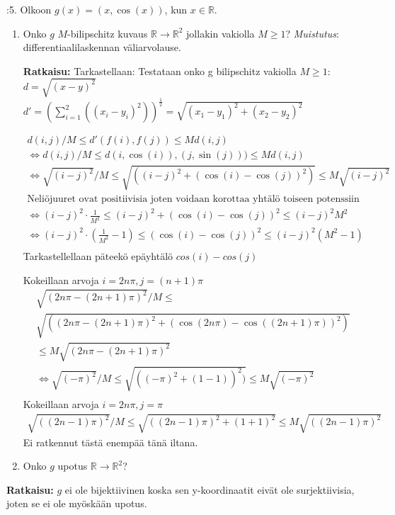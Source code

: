 \documentclass[12pt,a4paper,leqno]{amsart}
\begin{document}
\bigskip

:5.  Olkoon $g(x) = (x,\cos(x))$, kun $x \in \mathbb R$. 

\begin{enumerate}
\item  Onko $g$ $M$-bilipschitz kuvaus  $\mathbb R \to \mathbb R^2$ jollakin vakiolla $M \ge 1$?  \textit{Muistutus}: 
differentiaali\-laskennan väliarvolause. 

\textbf{Ratkaisu:}
Tarkastellaan:
Testataan onko g bilipschitz vakiolla $M \geq 1$:
\\
$d = \sqrt{(x - y)^2}$
$d' = (\sum^2_{i=1}((x_i - y_i)^2))^{\frac{1}{2}} = \sqrt{(x_1 - y_1)^2 + (x_2 - y_2)^2}$  

\begin{align*}
    d(i, j) / M \leq d'(f(i), f(j)) \leq M d(i, j) \\
    \iff d(i, j) / M \leq d(i,\cos(i)), (j,\sin(j))) \leq M d(i, j) \\ 
    \iff \sqrt{(i - j)^2} / M \leq \sqrt{((i - j)^2 + (\cos(i) - \cos(j))^2)}\leq M \sqrt{(i - j)^2} \\ 
    \text{Neliöjuuret ovat positiivisia joten voidaan korottaa yhtälö toiseen potenssiin} \\
    \iff (i - j)^2 \cdot \frac{1}{M^2} \leq (i - j)^2 + (\cos(i) - \cos(j))^2\leq (i - j)^2 M^2  \\ 
    \iff (i - j)^2 \cdot (\frac{1}{M^2} - 1) \leq (\cos(i) - \cos(j))^2\leq (i - j)^2 (M^2 - 1) \\
\end{align*}
Tarkastellellaan päteekö epäyhtälö $cos(i) - cos(j)$ 

Kokeillaan arvoja $i = 2n\pi, j=(n+1)\pi$
\begin{align*}
        \sqrt{(2n\pi - (2n+1)\pi)^2} / M \leq \\\sqrt{((2n\pi - (2n+1)\pi)^2 + (\cos(2n\pi) - \cos((2n+1)\pi))^2)} \\
    \leq M \sqrt{(2n\pi - (2n+1)\pi)^2} \\ 
    \iff \sqrt{(-\pi)^2} / M \leq \sqrt{((-\pi)^2 + (1 - 1))^2)} \leq M \sqrt{(-\pi)^2} \\ 
\end{align*}
Kokeillaan arvoja $i=2n\pi,j= \pi$
\begin{align*}
        \sqrt{((2n-1)\pi)^2} / M \leq \sqrt{((2n-1)\pi)^2 + (1 + 1)^2}  \leq M \sqrt{((2n-1)\pi)^2} 
\end{align*}
Ei ratkennut tästä enempää tänä iltana. 
\smallskip

\item Onko $g$ upotus $\mathbb R \to \mathbb R^2$?
\end{enumerate}
\textbf{Ratkaisu:} 
$g$ ei ole bijektiivinen koska sen y-koordinaatit eivät ole surjektiivisia, joten se ei ole myöskään upotus.
\bigskip
\end{document}
